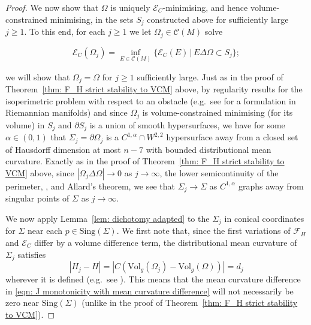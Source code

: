 \documentclass[12pt]{article}
\begin{document}
\begin{proof}
\bigskip
    
We now show that $\Omega$ is uniquely $\mathcal{E}_C$-minimising, and hence volume-constrained minimising, in the sets $S_j$ constructed above for sufficiently large $j \geq 1$. To this end, for each $j \geq 1$ we let $\Omega_j \in \mathcal{C}(M)$ solve

$$\mathcal{E}_C(\Omega_j) = \inf_{E \in \mathcal{C}(M)} \{ \mathcal{E}_C(E) \, | \, E \Delta \Omega \subset S_j\};$$

we will show that $\Omega_j = \Omega$ for $j \geq 1$ sufficiently large. Just as in the proof of Theorem~\ref{thm: F_H strict stability to VCM} above, by regularity results for the isoperimetric problem with respect to an obstacle (e.g.~see \cite[Theorem 1.1]{V10} for a formulation in Riemannian manifolds) and since $\Omega_j$ is volume-constrained minimising (for its volume) in $S_j$ and $\partial S_j$ is a union of smooth hypersurfaces, we have for some $\alpha \in (0,1)$ that $\Sigma_j = \partial \Omega_j$ is a $C^{1,\alpha}\cap W^{2,2}$ hypersurface away from a closed set of Hausdorff dimension at most $n - 7$ with bounded distributional mean curvature. Exactly as in the proof of Theorem~\ref{thm: F_H strict stability to VCM} above, since $|\Omega_j \Delta \Omega| \rightarrow 0$ as $j \rightarrow \infty$, the lower semicontinuity of the perimeter, \cite[Proposition A.1]{DT13}, and Allard's theorem, we see that $\Sigma_j \rightarrow \Sigma$ as $C^{1,\alpha}$ graphs away from singular points of $\Sigma$ as $j \rightarrow \infty$.


\bigskip

We now apply Lemma~\ref{lem: dichotomy adapted} to the $\Sigma_j$ in conical coordinates for $\Sigma$ near each $p \in \mathrm{Sing}(\Sigma)$. We first note that, since the first variations of $\mathcal{F}_H$ and $\mathcal{E}_C$ differ by a volume difference term, the distributional mean curvature of $\Sigma_j$ satisfies 
$$|H_j - H| = |C (\mathrm{Vol}_g(\Omega_j) - \mathrm{Vol}_g(\Omega))| = d_j$$
wherever it is defined (e.g.~see \cite[Theorem 1.1]{V10}). This means that the mean curvature difference in \eqref{eqn: J monotonicity with mean curvature difference} will not necessarily be zero near $\mathrm{Sing}(\Sigma)$ (unlike in the proof of Theorem~\ref{thm: F_H strict stability to VCM}).
\bigskip


\end{proof}
\end{document}
